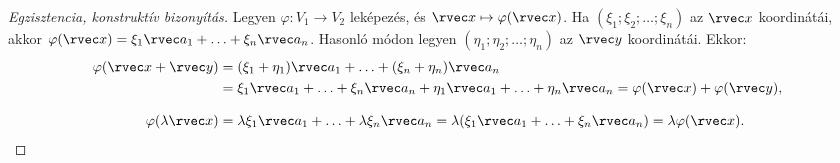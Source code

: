\begin{theorem}
  \begin{proof}[Egzisztencia, konstruktív bizonyítás]
    Legyen $\varphi: V_1 \rightarrow V_2$ leképezés, és
    $\rvec x \mapsto \varphi(\rvec x)$. Ha $(\xi_1; \xi_2; \ldots; \xi_n)$
    az $\rvec x$ koordinátái, akkor $\varphi(\rvec x) = \xi_1 \rvec a_1 +
      \ldots + \xi_n \rvec a_n$. Hasonló módon legyen $(\eta_1; \eta_2; \ldots;
      \eta_n)$ az $\rvec y$ koordinátái. Ekkor:
    \begin{align*}
      \varphi(\rvec x + \rvec y)
       & = (\xi_1 + \eta_1) \rvec a_1 + \ldots + (\xi_n + \eta_n) \rvec a_n
      \\
       & = \xi_1 \rvec a_1 + \ldots + \xi_n \rvec a_n
      + \eta_1 \rvec a_1 + \ldots + \eta_n \rvec a_n
      = \varphi(\rvec x) + \varphi(\rvec y)
      \text,
      \\[3mm]
      \varphi(\lambda \rvec x)
       & = \lambda \xi_1 \rvec a_1 + \ldots + \lambda \xi_n \rvec a_n
      = \lambda (\xi_1 \rvec a_1 + \ldots + \xi_n \rvec a_n)
      = \lambda \varphi(\rvec x)
      \text.
    \end{align*}
  \end{proof}
\end{theorem}

